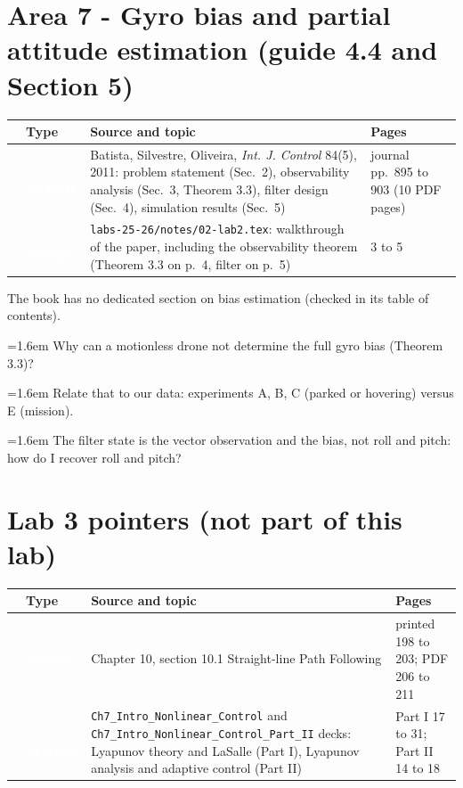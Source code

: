 \documentclass[10pt,a4paper]{article}
\newcommand{\cb}{\raisebox{-0.35ex}{\Large$\square$}}
\newcommand{\srctag}[2]{\colorbox{#1}{\textcolor{white}{\textbf{\scriptsize\,#2\,}}}}
\newcommand{\SLIDES}{\srctag{slides}{SLIDES}}
\newcommand{\BOOK}{\srctag{book}{BOOK}}
\newcommand{\NOTES}{\srctag{notes}{NOTES}}
\newcommand{\PAPER}{\srctag{paper}{PAPER}}
\newcommand{\chk}[1]{\par\noindent\hangindent=1.6em\hangafter=1 \cb\hspace{0.6em}#1}
\begin{document}
\section*{Area 7 - Gyro bias and partial attitude estimation \hfill\normalfont\small (guide 4.4 and Section 5)}

\begin{tabularx}{\textwidth}{@{}C T X l@{}}
\toprule
\cb & Type & Source and topic & Pages\\
\midrule
\cb & \PAPER & Batista, Silvestre, Oliveira, \emph{Int. J. Control} 84(5), 2011: problem statement (Sec.\ 2), observability analysis (Sec.\ 3, Theorem 3.3), filter design (Sec.\ 4), simulation results (Sec.\ 5) & journal pp.\ 895 to 903 (10 PDF pages)\\
\cb & \NOTES & \texttt{labs-25-26/notes/02-lab2.tex}: walkthrough of the paper, including the observability theorem (Theorem 3.3 on p.\ 4, filter on p.\ 5) & 3 to 5\\
\bottomrule
\end{tabularx}
The book has no dedicated section on bias estimation (checked in its table of contents).
\begin{selfcheck}
\chk{Why can a motionless drone not determine the full gyro bias (Theorem 3.3)?}
\chk{Relate that to our data: experiments A, B, C (parked or hovering) versus E (mission).}
\chk{The filter state is the vector observation and the bias, not roll and pitch: how do I recover roll and pitch?}
\end{selfcheck}

\section*{Lab 3 pointers (not part of this lab)}

\begin{tabularx}{\textwidth}{@{}C T X l@{}}
\toprule
\cb & Type & Source and topic & Pages\\
\midrule
\cb & \BOOK & Chapter 10, section 10.1 Straight-line Path Following & printed 198 to 203; PDF 206 to 211\\
\cb & \SLIDES & \texttt{Ch7\_Intro\_Nonlinear\_Control} and \texttt{Ch7\_Intro\_Nonlinear\_Control\_Part\_II} decks: Lyapunov theory and LaSalle (Part I), Lyapunov analysis and adaptive control (Part II) & Part I 17 to 31; Part II 14 to 18\\
\bottomrule
\end{tabularx}
\end{document}
